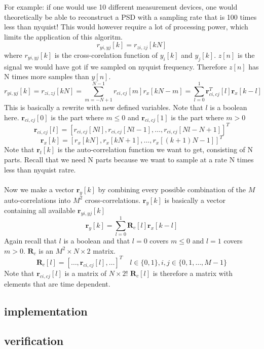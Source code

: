 \documentclass[report, oneside, a4paper, openany]{memoir}
\begin{document}
For example: if  one would use 10 different measurement devices, one would theoretically be able to reconstruct a PSD with a sampling rate that is 100 times less than nyquist! This would however require a lot of processing power, which limits the application of this algoritm.
$$
r_{yi,yj}[k] = r_{zi,zj}[kN]
$$
where $r_{yi,yj}[k]$ is the cross-corelation function of $y_i[k]$ and $y_j[k]$.
$z[n]$ is the signal we would have got if we sampled on nyquist frequency. Therefore $z[n]$ has N times more samples than $y[n]$.
$$
r_{yi,yj}[k] = r_{zi,zj}[kN] = \sum_{m=-N+1}^{N-1}r_{ci,cj}[m]r_x[kN-m] = \sum_{l=0}^1\mathbf{r}^T_{ci,cj}[l]\mathbf{r}_x[k-l]
$$
This is basically a rewrite with new defined variables. Note that $l$ is a boolean here. $\mathbf{r}_{ci,cj}[0]$ is the part where $m\leq 0$ and $\mathbf{r}_{ci,cj}[1]$ is the part where $m > 0$ 
$$
\mathbf{r}_{ci,cj}[l] = [r_{ci,cj}[Nl], r_{ci,cj}[Nl-1], \dots, r_{ci,cj}[Nl-N+1]]^T
$$
$$
\mathbf{r}_x[k]= [r_x[kN],r_x[kN+1],\dots,r_x[(k+1)N-1]]^T
$$
Note that $\mathbf{r}_t[k]$ is the auto-correlation function we want to get, consisting of N parts. Recall that we need N parts because we want to sample at a rate N times less than nyquist ratre.\\
\\
Now we make a vector $\mathbf{r}_y[k]$ by combining every possible combination of the $M$ auto-correlations into $M^2$ cross-correlations. $\mathbf{r}_y[k]$ is basically a vector containing all available $\mathbf{r}_{yi,yj}[k]$
$$
\mathbf{r}_y[k]=\sum_{l=0}^1\mathbf{R}_c[l]\mathbf{r}_x[k-l]
$$
Again recall that $l$ is a boolean and that $l=0$ covers $m\leq 0$ and $l=1$ covers $m > 0$. $\mathbf{R}_c$ is an $M^2 \times N \times 2$ matrix.
$$
\mathbf{R}_c[l] = [\dots,\mathbf{r}_{ci,cj}[l],\dots]^T \quad l \in \{0,1\}, i,j \in \{0,1, \dots, M-1\}
$$
Note that $\mathbf{r}_{ci,cj}[l]$ is a matrix of $N \times 2$! $\mathbf{R}_c[l]$ is therefore a matrix with elements that are time dependent.





\subsection{implementation}

\subsection{verification}
\end{document}
